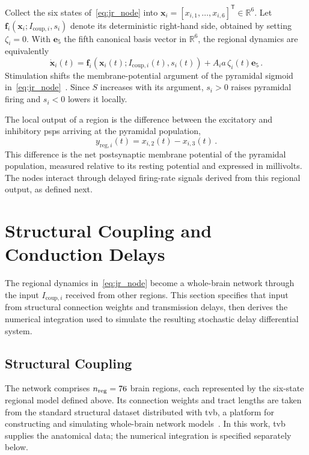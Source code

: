 Collect the six states of~\eqref{eq:jr_node} into \mbox{$\mathbf{x}_i={\left[x_{i,1},\ldots,x_{i,6}\right]}^{\mathsf T}\in\mathbb{R}^{6}$}.
Let $\mathbf{f}_i(\mathbf{x}_i;I_{\mathrm{coup},i},s_i)$ denote its deterministic right-hand side, obtained by setting $\zeta_i=0$.
With $\mathbf{e}_5$ the fifth canonical basis vector in $\mathbb{R}^6$, the regional dynamics are equivalently
%
\begin{equation}
    \dot{\mathbf{x}}_i(t)
    =\mathbf{f}_i\!\left(\mathbf{x}_i(t);I_{\mathrm{coup},i}(t),s_i(t)\right)
    +A_i a\,\zeta_i(t)\mathbf{e}_5\,.
    \label{eq:network_node}
\end{equation}
%
Stimulation shifts the membrane-potential argument of the pyramidal sigmoid in~\eqref{eq:jr_node}~\cite{Kunze2016,Merlet2013,Yu2024}.
Since $S$ increases with its argument, $s_i>0$ raises pyramidal firing and $s_i<0$ lowers it locally.

The local output of a region is the difference between the excitatory and inhibitory \acp{psp} arriving at the pyramidal population,
%
\begin{equation}
    y_{\mathrm{reg},i}(t)=x_{i,2}(t)-x_{i,3}(t)\,.
    \label{eq:regional_output}
\end{equation}
%
This difference is the net postsynaptic membrane potential of the pyramidal population, measured relative to its resting potential and expressed in millivolts.
The nodes interact through delayed firing-rate signals derived from this regional output, as defined next.

\section{Structural Coupling and Conduction Delays}
\label{sec:connectome}

The regional dynamics in~\eqref{eq:jr_node} become a whole-brain network through the input $I_{\mathrm{coup},i}$ received from other regions.
This section specifies that input from structural connection weights and transmission delays, then derives the numerical integration used to simulate the resulting stochastic delay differential system.

\subsection{Structural Coupling}

The network comprises $n_{\mathrm{reg}}{}=76$ brain regions, each represented by the six-state regional model defined above.
Its connection weights and tract lengths are taken from the standard structural dataset distributed with \ac{tvb}, a platform for constructing and simulating whole-brain network models~\cite{SanzLeon2013,SanzLeon2015}.
In this work, \ac{tvb} supplies the anatomical data; the numerical integration is specified separately below.

